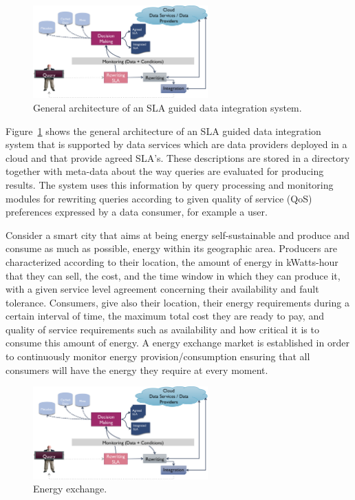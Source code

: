 \begin{figure}
\includegraphics[width=0.6\textwidth]{figs/arch.png}
\caption{General architecture of an SLA guided  data integration system.\label{fig:arch}}
\end{figure}

Figure~\ref{fig:arch} shows the general architecture of an SLA guided data integration system that is supported by data services which are data providers deployed in a cloud and that provide agreed SLA’s. 
These descriptions are stored in a directory together with meta-data about the way queries are evaluated for producing results. 
The system uses this information  by query processing and monitoring modules for rewriting queries according to given quality of service (QoS) preferences expressed by a data consumer, for example a user.


Consider a smart city that aims at being energy self-sustainable and produce and consume as much as possible, energy within its geographic area. 
Producers are characterized according to their location, the amount of energy in kWatts-hour that they can sell, the cost, and the time window in which they can produce it, with a given service level agreement concerning their availability and fault tolerance. 
Consumers, give also their location, their energy requirements during a certain interval of time, the maximum total cost they are ready to pay, and quality of service requirements such as availability and how critical it is to consume this amount of energy. 
A energy exchange market is established in order to continuously monitor energy provision/consumption ensuring that all consumers will have the energy they require at every moment.

\begin{figure}
\includegraphics[width=0.6\textwidth]{figs/arch.png}
\caption{\label{fig:energyXChange} Energy exchange.}
\end{figure}

